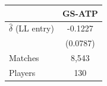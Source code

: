 \begin{tabular}{lc}
\toprule
 & GS-ATP \\
\midrule
$\hat{\delta}$ (LL entry) & -0.1227 \\
 & (0.0787) \\
\midrule
Matches & 8,543 \\
Players & 130 \\
\bottomrule
\end{tabular}

